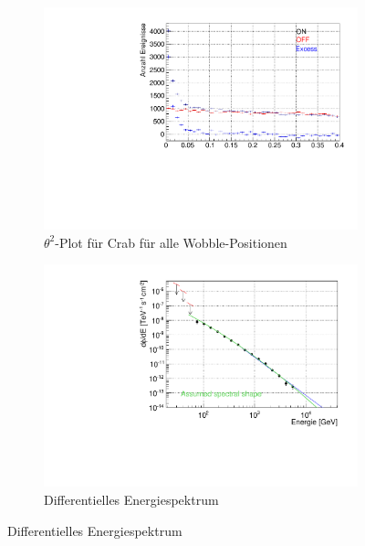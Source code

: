\begin{figure}
  \begin{subfigure}{0.45\linewidth}
  \includegraphics[width=\textwidth]{./Plots/04_MrkAnalyse/Datenset2/Crab_Theta2.pdf}
  \caption{$\theta^2$-Plot für Crab für alle Wobble-Positionen}
  \label{Datenset2_theta^2_Crab}
  \end{subfigure}
  \hfill
  \begin{subfigure}{0.45\linewidth}
  \includegraphics[width=\textwidth]{./Plots/04_MrkAnalyse/Datenset2/Crab_dFdE.pdf}
  \caption{Differentielles Energiespektrum}

\end{subfigure}
\end{figure}
